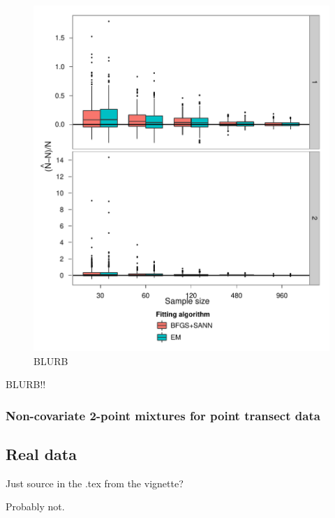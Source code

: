 \begin{figure}
\centering
\includegraphics[width=6in]{mix/figs/cov-N.pdf}
\caption{BLURB}
\label{mmds-cov-N-boxplots}
\end{figure}

BLURB!!





\subsubsection{Non-covariate 2-point mixtures for point transect data}



\subsection{Real data}

Just source in the .tex from the vignette?

Probably not.


